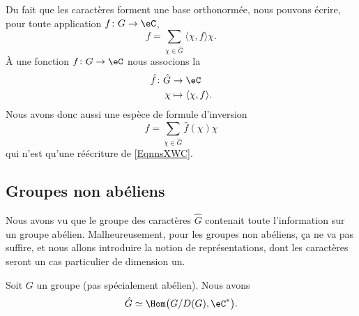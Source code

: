 Du fait que les caractères forment une base orthonormée, nous pouvons écrire, pour toute application \( f\colon G\to \eC\),
\begin{equation}    \label{EqnnsXWC}
    f=\sum_{\chi\in\hat G}\langle \chi, f\rangle \chi.
\end{equation}
À une fonction \( f\colon G\to \eC\) nous associons la 
\begin{equation}
    \begin{aligned}
        \hat f\colon \hat G&\to \eC \\
        \chi&\mapsto \langle \chi, f\rangle . 
    \end{aligned}
\end{equation}
Nous avons donc aussi une espèce de formule d'inversion
\begin{equation}
    f=\sum_{\chi\in\hat G}\hat f(\chi)\chi
\end{equation}
qui n'est qu'une réécriture de \ref{EqnnsXWC}.

\subsection{Groupes non abéliens}

Nous avons vu que le groupe des caractères \( \hat G\) contenait toute l'information sur un groupe abélien. Malheureusement, pour les groupes non abéliens, ça ne va pas suffire, et nous allons introduire la notion de représentations, dont les caractères seront un cas particulier de dimension un.

\begin{proposition}
    Soit \( G\) un groupe (pas spécialement abélien). Nous avons
    \begin{equation}
        \hat G\simeq\Hom\big( G/D(G),\eC^* \big).
    \end{equation}
\end{proposition}

